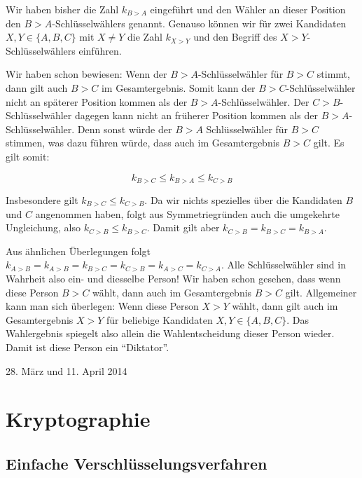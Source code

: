 \documentclass[a4paper,ngerman,12pt]{scrartcl}
\newcommand{\datum}[1]{\hfill {#1}\\}
\theoremstyle{definition}
\begin{document}
\begin{antw}
  Wir haben bisher die Zahl $k_{B>A}$ eingeführt und den Wähler an dieser Position den $B{>}A$-Schlüsselwählers genannt. Genauso können wir für zwei Kandidaten $X, Y \in \{ A, B, C \}$ mit $X \not= Y$ die Zahl $k_{X>Y}$ und den Begriff des $X{>}Y$-Schlüsselwählers einführen.

  Wir haben schon bewiesen: Wenn der $B{>}A$-Schlüsselwähler für $B>C$ stimmt, dann gilt auch $B>C$ im Gesamtergebnis. Somit kann der $B{>}C$-Schlüsselwähler nicht an späterer Position kommen als der $B{>}A$-Schlüsselwähler. Der $C{>}B$-Schlüsselwähler dagegen kann nicht an früherer Position kommen als der $B{>}A$-Schlüsselwähler. Denn sonst würde der $B{>}A$ Schlüsselwähler für $B{>}C$ stimmen, was dazu führen würde, dass auch im Gesamtergebnis $B{>}C$ gilt. Es gilt somit:

  \[ k_{B>C} \leq k_{B>A} \leq k_{C>B} \]

  Insbesondere gilt $k_{B>C} \leq k_{C>B}$. Da wir nichts spezielles über die Kandidaten $B$ und $C$ angenommen haben, folgt aus Symmetriegründen auch die umgekehrte Ungleichung, also $k_{C>B} \leq k_{B>C}$. Damit gilt aber $k_{C>B} = k_{B>C} = k_{B>A}$.

  Aus ähnlichen Überlegungen folgt $k_{A{>}B} = k_{A{>}B} = k_{B{>}C} = k_{C{>}B} = k_{A{>}C} = k_{C{>}A}$. Alle Schlüsselwähler sind in Wahrheit also ein- und diesselbe Person! Wir haben schon gesehen, dass wenn diese Person $B > C$ wählt, dann auch im Gesamtergebnis $B > C$ gilt. Allgemeiner kann man sich überlegen: Wenn diese Person $X > Y$ wählt, dann gilt auch im Gesamtergebnis $X > Y$ für beliebige Kandidaten $X, Y \in \{ A, B, C \}$. Das Wahlergebnis spiegelt also allein die Wahlentscheidung dieser Person wieder. Damit ist diese Person ein "`Diktator"'.
\end{antw}

\datum{28. März und 11. April 2014}

\section{Kryptographie}

\subsection{Einfache Verschlüsselungsverfahren}

\end{document}

